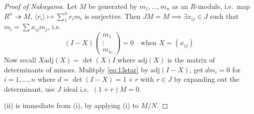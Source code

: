 \documentclass{article}
\begin{document}
\begin{proof}[Proof of Nakayama]
    Let $M$ be generated by $m_1, \dotsc, m_n$ as an $R$-module, i.e.\ map $R^n \twoheadrightarrow M$, $\langle r_i \rangle \mapsto \sum_{1}^n r_i m_i$ is surjective.
    Then $JM = M \implies \exists x_{ij} \in J$ such that $m_i = \sum x_{ij} m_j$, i.e.\
    \begin{equation*}
        (I-X)
        \begin{pmatrix}
            m_1 \\ \vdots \\ m_n
        \end{pmatrix}
        =0 \quad \text{when } X = (x_{ij}) \tag{$*$} \label{eq:13star}
    \end{equation*}
    Now recall $X \text{adj}(X) = \det(X) I$ where $\text{adj}(X)$ is the matrix of determinants of minors.
    Mulitply \eqref{eq:13star} by $\text{adj}(I-X)$, get $d m_i = 0$ for $i = 1, \dotsc, n$ where $d = \det(I-X) = 1+r$ with $r \in J$ by expanding out the determinant, use $J$ ideal i.e.\ $(1+r) M = 0$.

    (ii) is immediate from (i), by applying (i) to $M/N$.
\end{proof}
\end{document}
